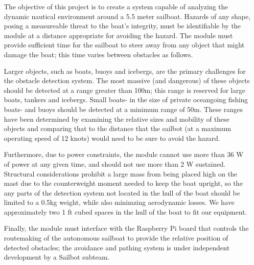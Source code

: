 The objective of this project is to create a system capable of analyzing the dynamic nautical environment around a 5.5 meter sailboat. Hazards of any shape, posing a measureable threat to the boat's integrity, must be identifiable by the module at a distance appropriate for avoiding the hazard. The module must provide sufficient time for the sailboat to steer away from any object that might damage the boat; this time varies between obstacles as follows.

Larger objects, such as boats, buoys and icebergs, are the primary challenges for the obstacle detection system. The most massive (and dangerous) of these objects should be detected at a range greater than 100m; this range is reserved for large boats, tankers and icebergs. Small boats- in the size of private oceangoing fishing boats- and buoys should be detected at a minimum range of 50m. These ranges have been determined by examining the relative sizes and mobility of these objects and comparing that to the distance that the sailbot (at a maximum operating speed of 12 knots) would need to be sure to avoid the hazard.

Furthermore, due to power constraints, the module cannot use more than 36 W of power at any given time, and should not use more than 2 W sustained. Structural considerations prohibit a large mass from being placed high on the mast due to the counterweight moment needed to keep the boat upright, so the any parts of the detection system not located in the hull of the boat should be limited to a 0.5kg weight, while also minimzing aerodynamic losses. We have approximately two 1 ft cubed spaces in the hull of the boat to fit our equipment. 

Finally, the module must interface with the Raspberry Pi board that controls the routemaking of the autonomous sailboat to provide the relative position of detected obstacles; the avoidance and pathing system is under independent development by a Sailbot subteam.

